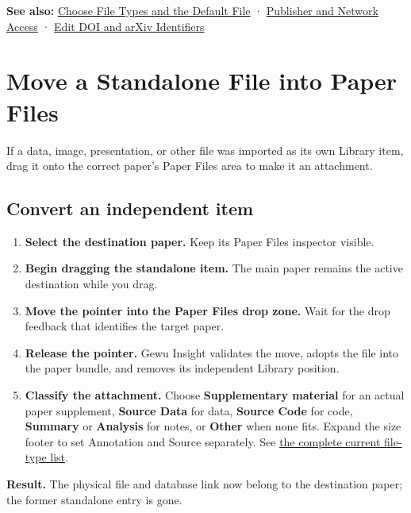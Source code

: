 \documentclass[10pt,letterpaper,oneside]{scrreprt}
\providecommand{\tightlist}{\setlength{\itemsep}{1pt}\setlength{\parskip}{0pt}}
\newenvironment{GewuRelated}{\par\nobreak\vspace{3pt}\nobreak\begingroup\small\sffamily\begin{samepage}\noindent}{\par\end{samepage}\endgroup}
\newenvironment{GewuLead}
  {\begin{list}{}{\leftmargin=0pt\rightmargin=0pt\topsep=0pt\partopsep=0pt\parsep=0pt}\item\relax
    \sffamily\fontsize{10.5}{13.2}\selectfont\color{GewuMuted}}
  {\end{list}}
\newenvironment{GewuResult}
  {\begin{tcolorbox}[enhanced,breakable,colback=GewuPale,colframe=GewuPale,boxrule=0pt,
    borderline west={1.6pt}{0pt}{GewuBlue},arc=1.2mm,left=2.5mm,right=2.5mm,top=1.7mm,bottom=1.7mm,
    before skip=4pt,after skip=5pt,fontupper=\color{GewuInk}\small\sffamily]}
  {\end{tcolorbox}}
\begin{document}
\begin{GewuRelated}
\textbf{See also:} \hyperref[versions-current]{Choose File Types and the Default File} · \hyperref[network-access]{Publisher and Network Access} · \hyperref[identifiers]{Edit DOI and arXiv Identifiers}
\end{GewuRelated}

\section{Move a Standalone File into Paper Files}\label{drag-attach}

\begin{GewuLead}
If a data, image, presentation, or other file was imported as its own Library item, drag it onto the correct paper's Paper Files area to make it an attachment.
\end{GewuLead}

\subsection{Convert an independent item}\label{convert-an-independent-item}

\begin{enumerate}
\tightlist
\item
  \textbf{Select the destination paper.} Keep its Paper Files inspector visible.
\item
  \textbf{Begin dragging the standalone item.} The main paper remains the active destination while you drag.
\item
  \textbf{Move the pointer into the Paper Files drop zone.} Wait for the drop feedback that identifies the target paper.
\item
  \textbf{Release the pointer.} Gewu Insight validates the move, adopts the file into the paper bundle, and removes its independent Library position.
\item
  \textbf{Classify the attachment.} Choose \textbf{Supplementary material} for an actual paper supplement, \textbf{Source Data} for data, \textbf{Source Code} for code, \textbf{Summary} or \textbf{Analysis} for notes, or \textbf{Other} when none fits. Expand the size footer to set Annotation and Source separately. See \hyperref[versions-current]{the complete current file-type list}.
\end{enumerate}

\begin{GewuResult}
\textbf{Result.} The physical file and database link now belong to the destination paper; the former standalone entry is gone.
\end{GewuResult}
\end{document}
